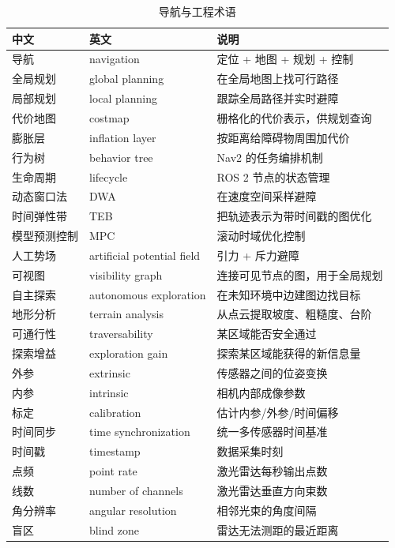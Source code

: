 \begin{table}[htbp]
  \centering
  \caption{导航与工程术语}\label{tab:b-nav}
  \footnotesize
  \begin{tabular}{llp{6.6cm}}
    \toprule
    中文 & 英文 & 说明 \\
    \midrule
    导航 & navigation & 定位 + 地图 + 规划 + 控制 \\
    全局规划 & global planning & 在全局地图上找可行路径 \\
    局部规划 & local planning & 跟踪全局路径并实时避障 \\
    代价地图 & costmap & 栅格化的代价表示，供规划查询 \\
    膨胀层 & inflation layer & 按距离给障碍物周围加代价 \\
    行为树 & behavior tree & Nav2 的任务编排机制 \\
    生命周期 & lifecycle & ROS 2 节点的状态管理 \\
    动态窗口法 & DWA & 在速度空间采样避障 \\
    时间弹性带 & TEB & 把轨迹表示为带时间戳的图优化 \\
    模型预测控制 & MPC & 滚动时域优化控制 \\
    人工势场 & artificial potential field & 引力 + 斥力避障 \\
    可视图 & visibility graph & 连接可见节点的图，用于全局规划 \\
    自主探索 & autonomous exploration & 在未知环境中边建图边找目标 \\
    地形分析 & terrain analysis & 从点云提取坡度、粗糙度、台阶 \\
    可通行性 & traversability & 某区域能否安全通过 \\
    探索增益 & exploration gain & 探索某区域能获得的新信息量 \\
    外参 & extrinsic & 传感器之间的位姿变换 \\
    内参 & intrinsic & 相机内部成像参数 \\
    标定 & calibration & 估计内参/外参/时间偏移 \\
    时间同步 & time synchronization & 统一多传感器时间基准 \\
    时间戳 & timestamp & 数据采集时刻 \\
    点频 & point rate & 激光雷达每秒输出点数 \\
    线数 & number of channels & 激光雷达垂直方向束数 \\
    角分辨率 & angular resolution & 相邻光束的角度间隔 \\
    盲区 & blind zone & 雷达无法测距的最近距离 \\

\end{tabular}
\end{table}
